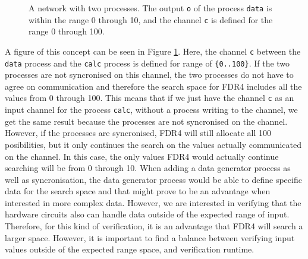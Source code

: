 \begin{figure}
    \centering
    \caption{A \cspm{} network with two processes. The output \texttt{o} of the process \texttt{data} is within the range 0 through 10, and the channel \texttt{c} is defined for the range 0 through 100.}
    \label{fig:csp_data_generator_process}
\end{figure}
A figure of this concept can be seen in Figure \ref{fig:csp_data_generator_process}. Here, the channel \texttt{c} between the \texttt{data} process and the \texttt{calc} process is defined for range of \texttt{\{0..100\}}. If the two processes are not syncronised on this channel, the two processes do not have to agree on communication and therefore the search space for FDR4 includes all the values from 0 through 100. This means that if we just have the channel \texttt{c} as an input channel for the process \texttt{calc}, without a process writing to the channel, we get the same result because the processes are not syncronised on the channel.
However, if the processes are syncronised, FDR4 will still allocate all 100 posibilities, but it only continues the search on the values actually communicated on the channel. In this case, the only values FDR4 would actually continue searching will be from 0 through 10.
When adding a data generator process as well as syncronisation, the data generator process would be able to define specific data for the search space and that might prove to be an advantage when interested in more complex data. However, we are interested in verifying that the hardware circuits also can handle data outside of the expected range of input. Therefore, for this kind of verification, it is an advantage that FDR4 will search a larger space. However, it is important to find a balance between verifying input values outside of the expected range space, and verification runtime.

